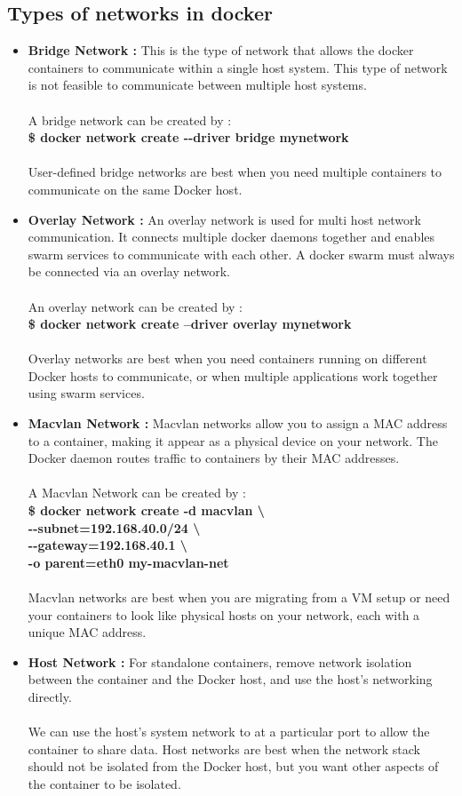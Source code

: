 \documentclass[12pt]{report}
\begin{document}
\subsection{Types of networks in docker}
\begin{itemize}
	\item \textbf{Bridge Network : }This is the type of network that allows the docker containers to communicate within a single host system. This type of network is not feasible to communicate between multiple host systems.\\\\
	A bridge network can be created by :\\
	\textbf{\$ docker network create -{}-driver bridge mynetwork}\\\\
	User-defined bridge networks are best when you need multiple containers to communicate on the same Docker host.
	\item \textbf{Overlay Network : }An overlay network is used for multi host network communication. It connects multiple docker daemons together and enables swarm services to communicate with each other. A docker swarm must always be connected via an overlay network.\\\\
	An overlay network can be created by :\\
	\textbf{\$ docker network create --driver overlay mynetwork}\\\\
	Overlay networks are best when you need containers running on different Docker hosts to communicate, or when multiple applications work together using swarm services.
	\item \textbf{Macvlan Network : }Macvlan networks allow you to assign a MAC address to a container, making it appear as a physical device on your network. The Docker daemon routes traffic to containers by their MAC addresses.\\\\
	A Macvlan Network can be created by :\\
	\textbf{\$ docker network create -d macvlan \textbackslash \\
		-{}-subnet=192.168.40.0/24 \textbackslash \\
		-{}-gateway=192.168.40.1 \textbackslash \\
		-o parent=eth0 my-macvlan-net\\\\
	}
	Macvlan networks are best when you are migrating from a VM setup or need your containers to look like physical hosts on your network, each with a unique MAC address.
	\item \textbf{Host Network : }For standalone containers, remove network isolation between the container and the Docker host, and use the host’s networking directly.\\\\
	We can use the host’s system network to at a particular port to allow the container to share data. Host networks are best when the network stack should not be isolated from the Docker host, but you want other aspects of the container to be isolated.
\end{itemize}
\end{document}
